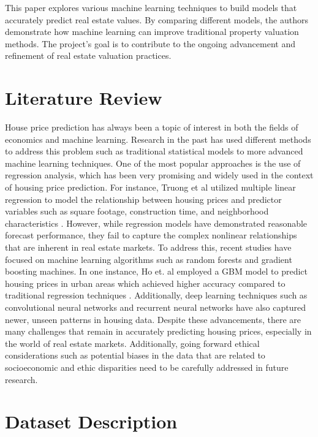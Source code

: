 \documentclass[conference, 11pt]{IEEEtran}
\begin{document}
This paper explores various machine learning techniques to build models that accurately predict real estate values. By comparing different models, the authors demonstrate how machine learning can improve traditional property valuation methods. The project's goal is to contribute to the ongoing advancement and refinement of real estate valuation practices.

\section{Literature Review}
House price prediction has always been a topic of interest in both the fields of economics and machine learning. Research in the past has used different methods to address this problem such as traditional statistical models to more advanced machine learning techniques. One of the most popular approaches is the use of regression analysis, which has been very promising and widely used in the context of housing price prediction. For instance, Truong et al utilized multiple linear regression to model the relationship between housing prices and predictor variables such as square footage, construction time, and neighborhood characteristics \cite{b2}. However, while regression models have demonstrated reasonable forecast performance, they fail to capture the complex nonlinear relationships that are inherent in real estate markets. To address this, recent studies have focused on machine learning algorithms such as random forests and gradient boosting machines. In one instance, Ho et. al employed a GBM model to predict housing prices in urban areas which achieved higher accuracy compared to traditional regression techniques \cite{b3}. Additionally, deep learning techniques such as convolutional neural networks and recurrent neural networks have also captured newer, unseen patterns in housing data. Despite these advancements, there are many challenges that remain in accurately predicting housing prices, especially in the world of real estate markets. Additionally, going forward ethical considerations such as potential biases in the data that are related to socioeconomic and ethic disparities need to be carefully addressed in future research. 

\section{Dataset Description}
\end{document}
